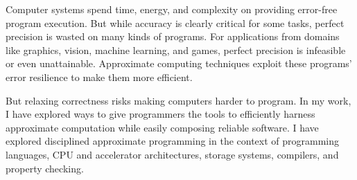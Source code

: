 Computer systems spend time, energy, and complexity on providing error-free
program execution. But while accuracy is clearly critical for some tasks,
perfect precision is wasted on many kinds of programs. For applications from
domains like graphics, vision, machine learning, and games, perfect precision
is infeasible or even unattainable. Approximate computing techniques exploit
these programs' error resilience to make them more efficient.

But relaxing correctness risks making computers harder to program. In my work,
I have explored ways to give programmers the tools to efficiently harness
approximate computation while easily composing reliable software. I have
explored disciplined approximate programming in the context of programming
languages, CPU and accelerator architectures, storage systems, compilers, and
property checking.
